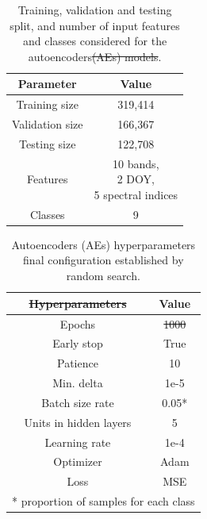 \documentclass[journal,article,submit,pdftex,moreauthors]{Definitions/mdpi}
\providecommand{\DIFadd}[1]{{\protect\color{blue}\uwave{#1}}} %
\providecommand{\DIFdel}[1]{{\protect\color{red}\sout{#1}}}                      %
\providecommand{\DIFaddFL}[1]{\DIFadd{#1}} %
\providecommand{\DIFdelFL}[1]{\DIFdel{#1}} %
\providecommand{\DIFaddbeginFL}{} %
\providecommand{\DIFaddendFL}{} %
\providecommand{\DIFdelbeginFL}{} %
\providecommand{\DIFdelendFL}{} %
\begin{document}
\begin{minipage}[t]{0.45\textwidth}
	\begin{table}[H]
        \centering
        \footnotesize
		\caption{Training, validation and testing split, and number of input features and classes considered for the autoencoders\DIFdelbeginFL \DIFdelFL{(AEs) models}\DIFdelendFL .}
		\begin{tabular}{c|c} 
			\hline
			Parameter & Value \\ [1ex] 
			\hline
			Training size & 319,414 \\ [1ex]
			Validation size & 166,367 \\[1ex]
			Testing size & 122,708 \\ [1ex]
			Features & \makecell{10 bands, \\ 2 DOY,\\ 5 spectral indices} \\ [1ex] 
			Classes & 9 \\ [1ex] 
			\hline
		\end{tabular}
	\label{data_split}
	\end{table}
\end{minipage}\hspace{0.5cm}
\begin{minipage}[t]{0.45\textwidth}
	\begin{table}[H]
        \centering
        \footnotesize
		\caption{Autoencoders (AEs) hyperparameters final configuration established by random search.}
		\begin{tabular}{c|c}
		\hline
			\DIFdelbeginFL \DIFdelFL{Hyperparameters }\DIFdelendFL \DIFaddbeginFL \DIFaddFL{Hyperparameter }\DIFaddendFL & Value \\ \hline
			Epochs & \DIFdelbeginFL \DIFdelFL{1000 }\DIFdelendFL \DIFaddbeginFL \DIFaddFL{10000 }\DIFaddendFL \\
			Early stop & True \\ 
			Patience & 10 \\ 
			Min. delta & 1e-5 \\ 
			Batch size rate & 0.05* \\ 
			Units in hidden layers & 5 \\ 
			Learning rate & 1e-4 \\ 
			Optimizer & Adam \\ 
			Loss & MSE \\ \hline
			\multicolumn{2}{c}{* proportion of samples for each class}
		\end{tabular}
		\label{hyperparameters_aes}
	\end{table}
\end{minipage}\vspace{0.5cm}
\end{document}
